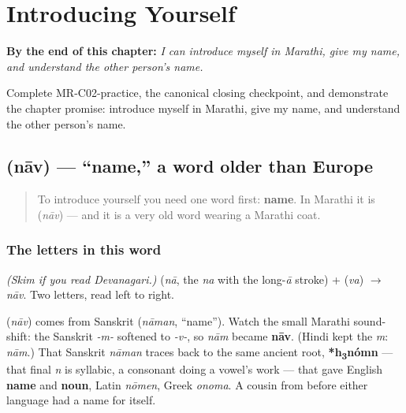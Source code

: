 
\chapter{Introducing Yourself}
\label{ch:introductions}

\begin{chapteropening}
\textbf{By the end of this chapter:} \emph{I can introduce myself in Marathi, give my name, and understand the other person's name.}

Complete MR-C02-practice, the canonical closing checkpoint, and demonstrate the chapter promise: introduce myself in Marathi, give my name, and understand the other person's name.
\end{chapteropening}

\section[\texorpdfstring{\mr{नाव} (nāv)}{नाव (nāv)}]{ (nāv) — \textquotedblleft{}name,\textquotedblright{} a word older than Europe}

\label{lesson:MR-C02-naav}



\begin{quote}
To introduce yourself you need one word first: \textbf{name}. In Marathi it is \textbf{} (\emph{nāv}) — and it is a very old word wearing a Marathi coat.
\end{quote}

\subsection*{The letters in this word}
\emph{(Skim if you read Devanagari.)} \textbf{} (\emph{nā}, the  \emph{na} with the \textbf{} long-\emph{ā} stroke) + \textbf{} (\emph{va}) $\to$ \textbf{} \emph{nāv}. Two letters, read left to right.

\begin{cousinweb}
\textbf{} (\emph{nāv}) comes from Sanskrit \textbf{} (\emph{nāman}, \textquotedblleft{}name\textquotedblright{}). Watch the small Marathi sound-shift: the Sanskrit \emph{-m-} softened to \emph{-v-}, so \emph{nām} became \textbf{nāv}. (Hindi kept the \emph{m}: \emph{nām}.) That Sanskrit \emph{nāman} traces back to the same ancient root, \textbf{*h\textsubscript{3}nómn} — that final \emph{n} is syllabic, a consonant doing a vowel's work — that gave English \textbf{name} and \textbf{noun}, Latin \emph{nōmen}, Greek \emph{onoma}. A cousin from before either language had a name for itself.
\end{cousinweb}

